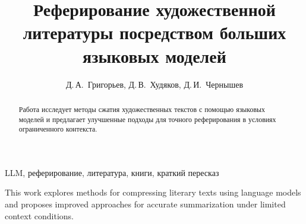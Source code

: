 \documentclass{article}
\begin{document}
\raggedbottom
{}


\title{Реферирование художественной литературы посредством больших языковых моделей}

\author{Д.\,А.~Григорьев\Addressmark[1]\Emailmark[1], Д.\,В.~Худяков\Addressmark[1]\Emailmark[2], Д.\,И.~Чернышев\Addressmark[1]\Emailmark[3]}











\maketitle
{}

\begin{abstract}
Работа исследует методы сжатия художественных текстов с помощью языковых моделей и предлагает улучшенные подходы для точного реферирования в условиях ограниченного контекста.
\end{abstract}

\begin{keywords}
LLM, реферирование, литература, книги, краткий пересказ
\end{keywords}

\begin{altabstract}
This work explores methods for compressing literary texts using language models and proposes improved approaches for accurate summarization under limited context conditions.
\end{altabstract}
\end{document}
